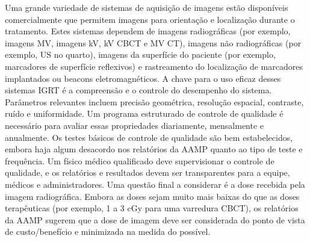\documentclass[11pt,a4paper]{article}
\newcounter{exemplo}
\begin{document}
    Uma grande variedade de sistemas de aquisição de imagens estão disponíveis comercialmente que permitem imagens para orientação e localização durante o tratamento. Estes sistemas dependem de imagens radiográficas (por exemplo, imagens MV, imagens kV, kV CBCT e MV CT), imagens não radiográficas (por exemplo, US no quarto), imagens da superfície do paciente (por exemplo, marcadores de superfície reflexivos) e rastreamento do localização de marcadores implantados ou beacons eletromagnéticos. A chave para o uso eficaz desses sistemas IGRT é a compreensão e o controle do desempenho do sistema. Parâmetros relevantes incluem precisão geométrica, resolução espacial, contraste, ruído e uniformidade. Um programa estruturado de controle de qualidade é necessário para avaliar essas propriedades diariamente, mensalmente e anualmente. Os testes básicos de controle de qualidade são bem estabelecidos, embora haja algum desacordo nos relatórios da AAMP quanto ao tipo de teste e frequência. Um físico médico qualificado deve supervisionar o controle de qualidade, e os relatórios e resultados devem ser transparentes para a equipe, médicos e administradores. Uma questão final a considerar é a dose recebida pela imagem radiográfica. Embora as doses sejam muito mais baixas do que as doses terapêuticas (por exemplo, 1 a 3 cGy para uma varredura CBCT), os relatórios da AAMP sugerem que a dose de imagem deve ser considerada do ponto de vista de custo/benefício e minimizada na medida do possível.


\end{document}
